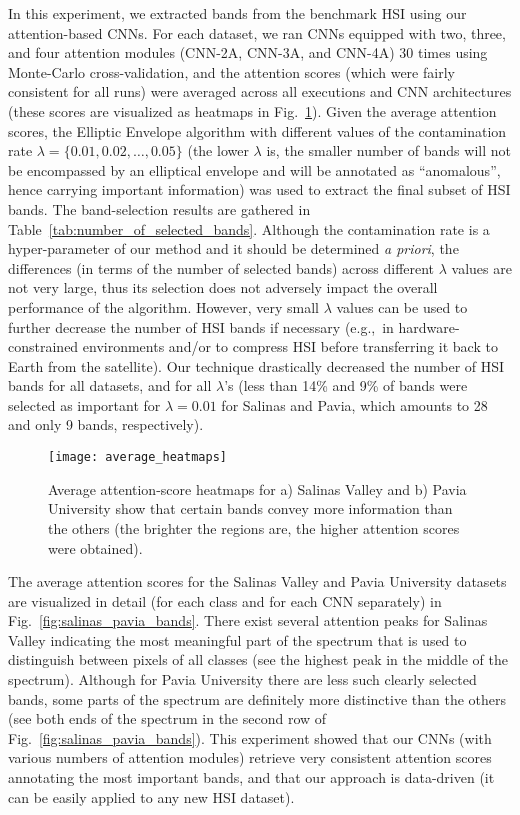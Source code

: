 \documentclass[journal]{IEEEtran}
\newcommand{\ContaminationRate}{\lambda}
\begin{document}
In this experiment, we extracted bands from the benchmark HSI using our attention-based CNNs. For each dataset, we ran CNNs equipped with two, three, and four attention modules (CNN-2A, CNN-3A, and CNN-4A) 30 times using Monte-Carlo cross-validation, and the attention scores (which were fairly consistent for all runs) were averaged across all executions and CNN architectures (these scores are visualized as heatmaps in Fig.~\ref{fig:average_heatmaps}). Given the average attention scores, the Elliptic Envelope algorithm with different values of the contamination rate $\ContaminationRate=\{0.01, 0.02,\dots, 0.05\}$ (the lower $\ContaminationRate$ is, the smaller number of bands will not be encompassed by an elliptical envelope and will be annotated as ``anomalous'', hence carrying important information) was used to extract the final subset of HSI bands. The band-selection results are gathered in Table~\ref{tab:number_of_selected_bands}. Although the contamination rate is a hyper-parameter of our method and it should be determined \emph{a priori}, the differences (in terms of the number of selected bands) across different $\ContaminationRate$ values are not very large, thus its selection does not adversely impact the overall performance of the algorithm. However, very small $\ContaminationRate$ values can be used to further decrease the number of HSI bands if necessary (e.g.,~in hardware-constrained environments and/or to compress HSI before transferring it back to Earth from the satellite). Our technique drastically decreased the number of HSI bands for all datasets, and for all $\ContaminationRate$'s (less than 14\% and 9\% of bands were selected as important for $\ContaminationRate=0.01$ for Salinas and Pavia, which amounts to 28 and only 9 bands, respectively).

\begin{figure}[ht!]
	\centering
	\texttt{[image: average\_heatmaps]}
	\caption{Average attention-score heatmaps for a) Salinas Valley and b) Pavia University show that certain bands convey more information than the others (the brighter the regions are, the higher attention scores were obtained).}
	\label{fig:average_heatmaps}
\end{figure}

The average attention scores for the Salinas Valley and Pavia University datasets are visualized in detail (for each class and for each CNN separately) in Fig.~\ref{fig:salinas_pavia_bands}. There exist several attention peaks for Salinas Valley indicating the most meaningful part of the spectrum that is used to distinguish between pixels of all classes (see the highest peak in the middle of the spectrum). Although for Pavia University there are less such clearly selected bands, some parts of the spectrum are definitely more distinctive than the others (see both ends of the spectrum in the second row of Fig.~\ref{fig:salinas_pavia_bands}). This experiment showed that our CNNs (with various numbers of attention modules) retrieve very consistent attention scores annotating the most important bands, and that our approach is data-driven (it can be easily applied to any new HSI dataset).
\end{document}
